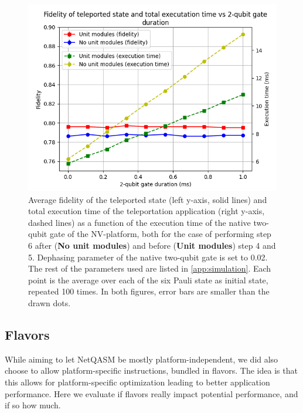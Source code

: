 \begin{figure}[t]
    \centering
    \includegraphics[scale=0.8]{figures/netqasm/plots/paper_teleport_sweep_gate_time.png}
    \caption{
        Average fidelity of the teleported state (left y-axis, solid lines) and total
        execution time of the teleportation application (right y-axis, dashed
        lines) as a function of the execution time of the native two-qubit gate
        of the NV-platform, both for the case of performing step 6 after
        (\textbf{No unit modules}) and before (\textbf{Unit modules}) step 4 and
        5. Dephasing parameter of the native two-qubit gate is set to 0.02. The
        rest of the parameters used are listed in \cref{app:simulation}. Each
        point is the average over each of the six Pauli state as initial state,
        repeated 100 times. In both figures, error bars are smaller than the drawn
        dots.}
  \label{fig:sweep_gate_time}
\end{figure}



\subsection{Flavors}
\label{netqasm:sec:evaluation-flavours}
While aiming to let \ac{NetQASM} be mostly platform-independent, we did also choose to allow platform-specific instructions, bundled in flavors.
The idea is that this allows for platform-specific optimization leading to better application performance.
Here we evaluate if flavors really impact potential performance, and if so how much.

